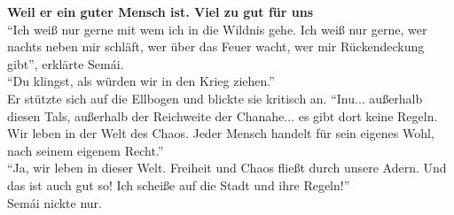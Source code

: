 \textbf{Weil er ein guter Mensch ist. Viel zu gut für uns}\\
``Ich weiß nur gerne mit wem ich in die Wildnis gehe. Ich weiß nur gerne, wer nachts neben mir 
schläft, wer über das Feuer wacht, wer mir Rückendeckung gibt'', erklärte Semái.\\
``Du klingst, als würden wir in den Krieg ziehen.''\\
Er stützte sich auf die Ellbogen und blickte sie kritisch an. ``Inu... außerhalb diesen Tals, 
außerhalb der Reichweite der Chanahe... es gibt dort keine Regeln. Wir leben in der Welt des Chaos. 
Jeder Mensch handelt für sein eigenes Wohl, nach seinem eigenem Recht.''\\
``Ja, wir leben in dieser Welt. Freiheit und Chaos fließt durch unsere Adern. Und das ist auch gut 
so! Ich scheiße auf die Stadt und ihre Regeln!''\\
Semái nickte nur.\\

